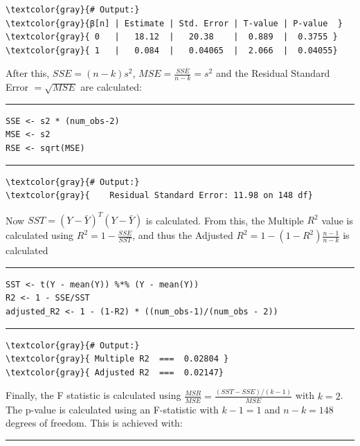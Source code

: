 \documentclass{article}
\begin{document}
\begin{Verbatim}[commandchars=\\\{\}]
\textcolor{gray}{# Output:}
\textcolor{gray}{β[n] | Estimate | Std. Error | T-value | P-value  }
\textcolor{gray}{ 0   |   18.12  |   20.38    |  0.889  |  0.3755 }
\textcolor{gray}{ 1   |   0.084  |   0.04065  |  2.066  |  0.04055}
\end{Verbatim}
After this, $SSE = (n-k)s^2$, $MSE = \frac{SSE}{n-k} = s^2$ and the Residual Standard Error $ = \sqrt{MSE}$ are calculated:
\newpage
\par\noindent\rule{\textwidth}{0.4pt}
\vspace{-25pt} %
\begin{verbatim}
SSE <- s2 * (num_obs-2)
MSE <- s2
RSE <- sqrt(MSE)
\end{verbatim}
\vspace{-15pt} %
\par\noindent\rule{\textwidth}{0.4pt}
\begin{Verbatim}[commandchars=\\\{\}]
\textcolor{gray}{# Output:}
\textcolor{gray}{    Residual Standard Error: 11.98 on 148 df}
\end{Verbatim}
Now $SST = (Y - \bar{Y})^T(Y - \bar{Y})$ is calculated. From this, the Multiple $R^2$ value is calculated using $R^2 = 1 - \frac{SSE}{SST}$, and thus the Adjusted $R^2 = 1 - (1 - R^2) \frac{n-1}{n-k}$ is calculated 
\par\noindent\rule{\textwidth}{0.4pt}
\vspace{-25pt} %
\begin{verbatim}
SST <- t(Y - mean(Y)) %*% (Y - mean(Y))
R2 <- 1 - SSE/SST
adjusted_R2 <- 1 - (1-R2) * ((num_obs-1)/(num_obs - 2))
\end{verbatim}
\vspace{-15pt} %
\par\noindent\rule{\textwidth}{0.4pt}
\begin{Verbatim}[commandchars=\\\{\}]
\textcolor{gray}{# Output:}
\textcolor{gray}{ Multiple R2  ===  0.02804 }
\textcolor{gray}{ Adjusted R2  ===  0.02147}
\end{Verbatim}
Finally, the F statistic is calculated using $\frac{MSR}{MSE} = \frac{(SST-SSE)/(k-1)}{MSE}$ with $k=2$. The p-value is calculated using an F-statistic with $k-1=1$ and $n-k = 148$ degrees of freedom. This is achieved with:
\par\noindent\rule{\textwidth}{0.4pt}
\end{document}
